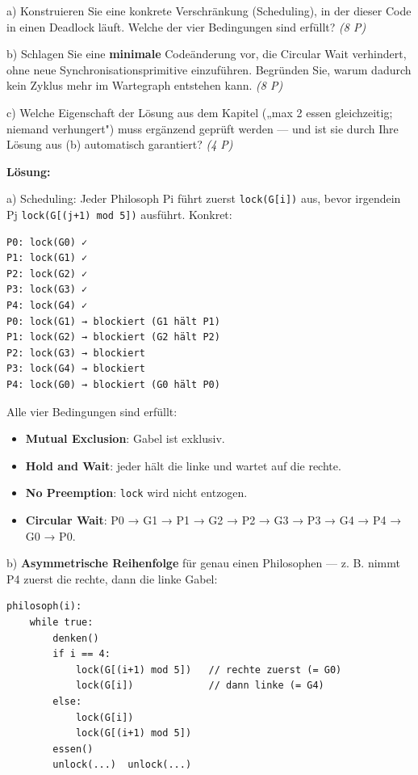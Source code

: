 \documentclass[11pt, a4paper]{article}
\begin{document}
a) Konstruieren Sie eine konkrete Verschränkung (Scheduling), in der dieser Code in einen Deadlock läuft. Welche der vier Bedingungen sind erfüllt? \textit{(8 P)}


b) Schlagen Sie eine \textbf{minimale} Codeänderung vor, die Circular Wait verhindert, ohne neue Synchronisationsprimitive einzuführen. Begründen Sie, warum dadurch kein Zyklus mehr im Wartegraph entstehen kann. \textit{(8 P)}


c) Welche Eigenschaft der Lösung aus dem Kapitel („max 2 essen gleichzeitig; niemand verhungert") muss ergänzend geprüft werden — und ist sie durch Ihre Lösung aus (b) automatisch garantiert? \textit{(4 P)}


\textbf{Lösung:}


a) Scheduling: Jeder Philosoph Pi führt zuerst \texttt{lock(G[i])} aus, bevor irgendein Pj \texttt{lock(G[(j+1) mod 5])} ausführt. Konkret:

\begin{lstlisting}
P0: lock(G0) ✓
P1: lock(G1) ✓
P2: lock(G2) ✓
P3: lock(G3) ✓
P4: lock(G4) ✓
P0: lock(G1) → blockiert (G1 hält P1)
P1: lock(G2) → blockiert (G2 hält P2)
P2: lock(G3) → blockiert
P3: lock(G4) → blockiert
P4: lock(G0) → blockiert (G0 hält P0)
\end{lstlisting}

Alle vier Bedingungen sind erfüllt:

\begin{itemize}
  \item \textbf{Mutual Exclusion}: Gabel ist exklusiv.
  \item \textbf{Hold and Wait}: jeder hält die linke und wartet auf die rechte.
  \item \textbf{No Preemption}: \texttt{lock} wird nicht entzogen.
  \item \textbf{Circular Wait}: P0 → G1 → P1 → G2 → P2 → G3 → P3 → G4 → P4 → G0 → P0.
\end{itemize}

b) \textbf{Asymmetrische Reihenfolge} für genau einen Philosophen — z. B. nimmt P4 zuerst die rechte, dann die linke Gabel:

\begin{lstlisting}
philosoph(i):
    while true:
        denken()
        if i == 4:
            lock(G[(i+1) mod 5])   // rechte zuerst (= G0)
            lock(G[i])             // dann linke (= G4)
        else:
            lock(G[i])
            lock(G[(i+1) mod 5])
        essen()
        unlock(...)  unlock(...)
\end{lstlisting}
\end{document}

